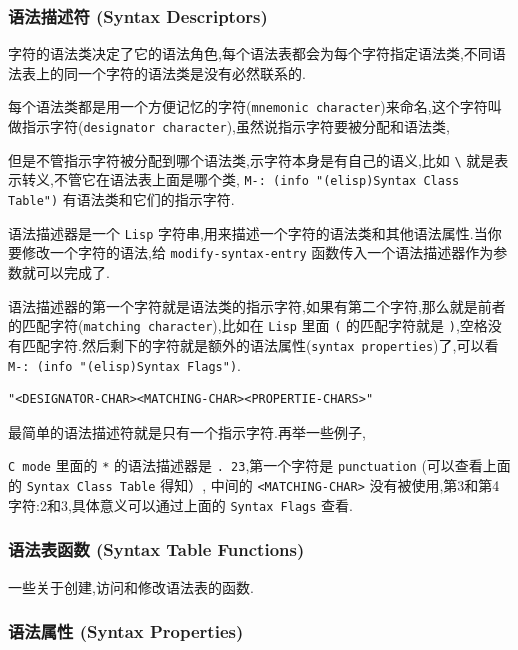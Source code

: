 \documentclass[11pt]{article}
\begin{document}
\subsubsection{语法描述符 (Syntax Descriptors)}
\label{sec:org7b8ff48}

字符的语法类决定了它的语法角色,每个语法表都会为每个字符指定语法类,不同语法表上的同一个字符的语法类是没有必然联系的.

每个语法类都是用一个方便记忆的字符(\texttt{mnemonic character})来命名,这个字符叫做指示字符(\texttt{designator character}),虽然说指示字符要被分配和语法类,

但是不管指示字符被分配到哪个语法类,示字符本身是有自己的语义,比如 \texttt{\textbackslash{}} 就是表示转义,不管它在语法表上面是哪个类, \texttt{M-: (info "(elisp)Syntax Class Table")} 有语法类和它们的指示字符.

语法描述器是一个 \texttt{Lisp} 字符串,用来描述一个字符的语法类和其他语法属性.当你要修改一个字符的语法,给 \texttt{modify-syntax-entry} 函数传入一个语法描述器作为参数就可以完成了.

语法描述器的第一个字符就是语法类的指示字符,如果有第二个字符,那么就是前者的匹配字符(\texttt{matching character}),比如在 \texttt{Lisp} 里面 \texttt{(} 的匹配字符就是 \texttt{)},空格没有匹配字符.然后剩下的字符就是额外的语法属性(\texttt{syntax properties})了,可以看 \texttt{M-: (info "(elisp)Syntax Flags")}.

\begin{verbatim}
"<DESIGNATOR-CHAR><MATCHING-CHAR><PROPERTIE-CHARS>"
\end{verbatim}

最简单的语法描述符就是只有一个指示字符.再举一些例子,

\texttt{C mode} 里面的 \texttt{*} 的语法描述器是 \texttt{. 23},第一个字符是 \texttt{punctuation} (可以查看上面的 \texttt{Syntax Class Table} 得知）, 中间的 \texttt{<MATCHING-CHAR>} 没有被使用,第3和第4字符:2和3,具体意义可以通过上面的 \texttt{Syntax Flags} 查看.



\subsubsection{语法表函数 (Syntax Table Functions)}
\label{sec:org9efda2d}

一些关于创建,访问和修改语法表的函数.


\subsubsection{语法属性 (Syntax Properties)}
\label{sec:org34a36dd}
\end{document}
